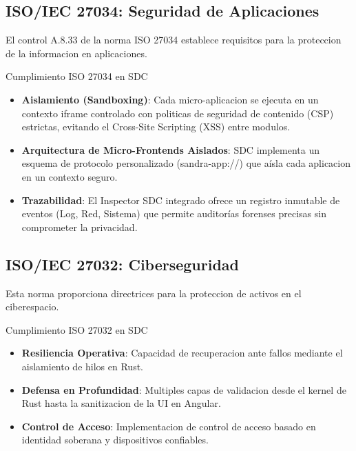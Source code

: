 
\subsection{ISO/IEC 27034: Seguridad de Aplicaciones}

El control A.8.33 de la norma ISO 27034 establece requisitos para la proteccion de la informacion en aplicaciones.

\begin{caja}{Cumplimiento ISO 27034 en SDC}
\begin{itemize}
\item \textbf{Aislamiento (Sandboxing)}: Cada micro-aplicacion se ejecuta en un contexto iframe controlado con politicas de seguridad de contenido (CSP) estrictas, evitando el Cross-Site Scripting (XSS) entre modulos.

\item \textbf{Arquitectura de Micro-Frontends Aislados}: SDC implementa un esquema de protocolo personalizado (sandra-app://) que aísla cada aplicacion en un contexto seguro.

\item \textbf{Trazabilidad}: El Inspector SDC integrado ofrece un registro inmutable de eventos (Log, Red, Sistema) que permite auditorías forenses precisas sin comprometer la privacidad.
\end{itemize}
\end{caja}


\subsection{ISO/IEC 27032: Ciberseguridad}

Esta norma proporciona directrices para la proteccion de activos en el ciberespacio.

\begin{caja}{Cumplimiento ISO 27032 en SDC}
\begin{itemize}
\item \textbf{Resiliencia Operativa}: Capacidad de recuperacion ante fallos mediante el aislamiento de hilos en Rust.

\item \textbf{Defensa en Profundidad}: Multiples capas de validacion desde el kernel de Rust hasta la sanitizacion de la UI en Angular.

\item \textbf{Control de Acceso}: Implementacion de control de acceso basado en identidad soberana y dispositivos confiables.
\end{itemize}
\end{caja}

